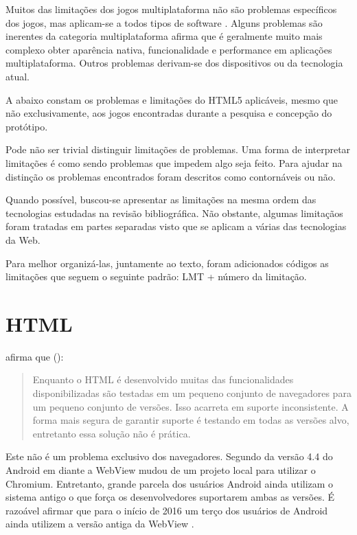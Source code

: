 
Muitos das limitações dos jogos multiplataforma não são
problemas específicos dos jogos, mas aplicam-se a todos tipos
de software \autocite[p. 3]{currentStateCrossPlatform}. Alguns
problemas são inerentes da categoria multiplataforma \citet[p.
7 ]{viabilityBusinessApplications} afirma que é geralmente muito
mais complexo obter aparência nativa, funcionalidade e performance
em aplicações multiplataforma. Outros problemas derivam-se dos
dispositivos ou da tecnologia atual.

A abaixo constam os problemas e limitações do HTML5 aplicáveis, mesmo que não
exclusivamente, aos jogos encontradas durante a pesquisa e concepção
do protótipo.

Pode não ser trivial distinguir limitações de
problemas. Uma forma de interpretar limitações é como sendo problemas
que impedem algo seja feito. Para ajudar na distinção os
problemas encontrados foram descritos como contornáveis ou não.

Quando possível, buscou-se apresentar as limitações na
mesma ordem das tecnologias estudadas na revisão bibliográfica. Não
obstante, algumas limitaçãos foram tratadas em partes
separadas visto que se aplicam a várias das tecnologias da Web.

Para melhor organizá-las, juntamente ao texto, foram adicionados
códigos as limitações que seguem o seguinte padrão: LMT + número da
limitação.

\section{HTML}

\citet{crossPlatformMobileGame} afirma que ():
\begin{quote}
Enquanto o HTML é desenvolvido muitas das funcionalidades
disponibilizadas são testadas em um pequeno conjunto de navegadores
para um pequeno conjunto de versões. Isso acarreta em suporte
inconsistente. A forma mais segura de garantir suporte é testando em
todas as versões alvo, entretanto essa solução não é prática.
\end{quote}

Este não é um problema exclusivo dos navegadores. Segundo
\citet{chromeWebView} da versão 4.4 do Android em diante a WebView
mudou de um projeto local para utilizar o Chromium. Entretanto, grande
parcela dos usuários Android ainda utilizam o sistema antigo o que
força os desenvolvedores suportarem ambas as versões. É razoável
afirmar que para o início de 2016 um terço dos usuários de Android
ainda utilizem a versão antiga da WebView \autocite{chromeWebView}.

